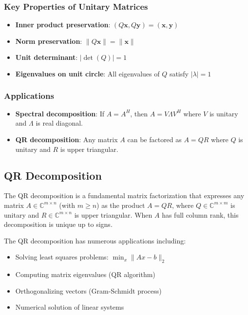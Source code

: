 \subsubsection{Key Properties of Unitary Matrices}

\begin{itemize}
    \item \textbf{Inner product preservation}: $(Q\mathbf{x}, Q\mathbf{y}) = (\mathbf{x}, \mathbf{y})$
    \item \textbf{Norm preservation}: $\|Q\mathbf{x}\| = \|\mathbf{x}\|$
    \item \textbf{Unit determinant}: $|\det(Q)| = 1$
    \item \textbf{Eigenvalues on unit circle}: All eigenvalues of $Q$ satisfy $|\lambda| = 1$
\end{itemize}

\subsubsection{Applications}
\begin{itemize}
    \item \textbf{Spectral decomposition}: If $A = A^H$, then $A = V\Lambda V^H$ where $V$ is unitary and $\Lambda$ is real diagonal.
    \item \textbf{QR decomposition}: Any matrix $A$ can be factored as $A = QR$ where $Q$ is unitary and $R$ is upper triangular.
\end{itemize}

\subsection{QR Decomposition}
The QR decomposition is a fundamental matrix factorization that expresses any matrix $A \in \mathbb{C}^{m \times n}$ (with $m \geq n$) as the product $A = QR$, where $Q \in \mathbb{C}^{m \times m}$ is unitary and $R \in \mathbb{C}^{m \times n}$ is upper triangular. When $A$ has full column rank, this decomposition is unique up to signs.

The QR decomposition has numerous applications including:
\begin{itemize}
    \item Solving least squares problems: $\min_x \|Ax - b\|_2$
    \item Computing matrix eigenvalues (QR algorithm)
    \item Orthogonalizing vectors (Gram-Schmidt process)
    \item Numerical solution of linear systems
\end{itemize}

